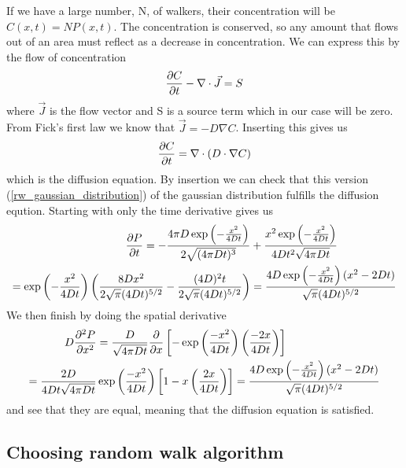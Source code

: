 If we have a large number, N, of walkers, their concentration will be $C(x,t) = NP(x,t)$. 
The concentration is conserved, so any amount that flows out of an area must reflect as a decrease in concentration. 
We can express this by the flow of concentration
\begin{equation}
 \frac{\partial C}{\partial t} -\nabla\cdot\vec{J} = S
\end{equation}
where $\vec{J}$ is the flow vector and S is a source term which in our case will be zero.
From Fick's first law we know that $\vec{J} = -D\nabla C$. Inserting this gives us
\begin{equation}\label{simple_diffusion_equation}
 \frac{\partial C}{\partial t} = \nabla\cdot \left(D\cdot\nabla C\right)
\end{equation}
which is the diffusion equation.
By insertion we can check that this version (\ref{rw_gaussian_distribution}) of the gaussian distribution fulfills the diffusion eqution. 
Starting with only the time derivative gives us
\begin{align*}
 \frac{\partial P}{\partial t} = -\frac{4\pi D\exp\left(-\frac{x^2}{4Dt}\right)}{2\sqrt{(4\pi Dt)^3}}&+\frac{x^2\exp\left(-\frac{x^2}{4Dt}\right)}{4Dt^2\sqrt{4\pi Dt}} \\
 = \exp\left(-\frac{x^2}{4Dt}\right)\left(\frac{8Dx^2}{2\sqrt{\pi}(4Dt)^{5/2}} -\frac{(4D)^2t}{2\sqrt{\pi}(4Dt)^{5/2}}\right)&= \frac{4D\exp\left(-\frac{x^2}{4Dt}\right)(x^2-2Dt)}{\sqrt{\pi}(4Dt)^{5/2}}
\end{align*}
 We then finish by doing the spatial derivative
\begin{align*}
 D\frac{\partial^2 P}{\partial x^2} &= \frac{D}{\sqrt{4\pi Dt}}\frac{\partial}{\partial x}\left[-\exp\left(\frac{-x^2}{4Dt}\right)\left(\frac{-2x}{4Dt}\right)\right]\\
 = \frac{2D}{4Dt\sqrt{4\pi Dt}}&\exp\left(\frac{-x^2}{4Dt}\right)\left[1-x\left(\frac{2x}{4Dt}\right)\right] = \frac{4D\exp\left(-\frac{x^2}{4Dt}\right)(x^2-2Dt)}{\sqrt{\pi}(4Dt)^{5/2}}
\end{align*}
and see that they are equal, meaning that the diffusion equation is satisfied.

\subsection{Choosing random walk algorithm}\label{choosing_random_walk_algorithm}

